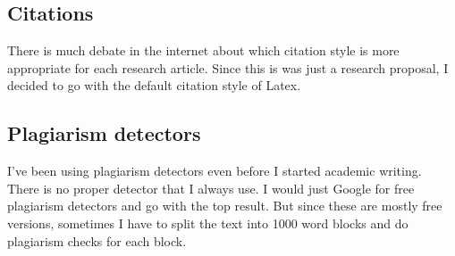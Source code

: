 \subsection{Citations}
There is much debate in the internet about which citation style is more appropriate 
for each research article. Since this is was just a research proposal, I decided to 
go with the default citation style of Latex.

\subsection{Plagiarism detectors}
I've been using plagiarism detectors even before I started academic writing. 
There is no proper detector that I always use. I would just Google for free 
plagiarism detectors and go with the top result. But since these are mostly free 
versions, sometimes I have to split the text into 1000 word blocks and do 
plagiarism checks for each block.

